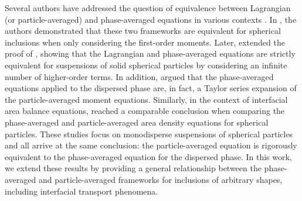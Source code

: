 




Several authors have addressed the question of equivalence between Lagrangian (or particle-averaged) and phase-averaged equations in various contexts \citep{zhang1997momentum,lhuillier2000bilan,nott2011suspension}. 
In \citet[Appendix A]{zhang1997momentum}, the authors demonstrated that these two frameworks are equivalent for spherical inclusions when only considering the first-order moments. 
Later, \citet[Appendix A]{nott2011suspension} extended the proof of \citet{zhang1997momentum}, showing that the Lagrangian and phase-averaged equations are strictly equivalent for suspensions of solid spherical particles by considering an infinite number of higher-order terms. 
In addition, \citet{lhuillier2010multiphase} argued that the phase-averaged equations applied to the dispersed phase are, in fact, a Taylor series expansion of the particle-averaged moment equations.
Similarly, in the context of interfacial area balance equations, \citet{lhuillier2000bilan} reached a comparable conclusion when comparing the phase-averaged and particle-averaged area density equations for spherical particles. 
These studies focus on monodisperse suspensions of spherical particles and all arrive at the same conclusion: the particle-averaged equation is rigorously equivalent to the phase-averaged equation for the dispersed phase.
In this work, we extend these results by providing a general relationship between the phase-averaged and particle-averaged frameworks for inclusions of arbitrary shapes, including interfacial transport phenomena.

